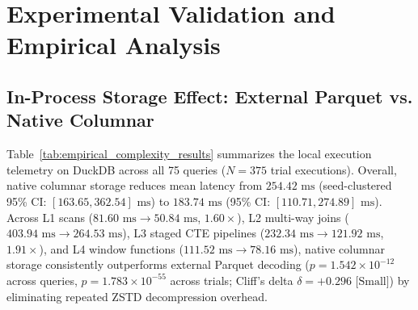 \documentclass[10pt,a4paper]{article}
\begin{document}
\section{Experimental Validation and Empirical Analysis}
\subsection{In-Process Storage Effect: External Parquet vs. Native Columnar}
Table~\ref{tab:empirical_complexity_results} summarizes the local execution telemetry on DuckDB across all 75 queries ($N=375$ trial executions). Overall, native columnar storage reduces mean latency from $254.42\text{ ms}$ (seed-clustered 95\% CI: $[163.65, 362.54]\text{ ms}$) to $183.74\text{ ms}$ (95\% CI: $[110.71, 274.89]\text{ ms}$). Across L1 scans ($81.60\text{ ms} \rightarrow 50.84\text{ ms}$, $1.60\times$), L2 multi-way joins ($403.94\text{ ms} \rightarrow 264.53\text{ ms}$), L3 staged CTE pipelines ($232.34\text{ ms} \rightarrow 121.92\text{ ms}$, $1.91\times$), and L4 window functions ($111.52\text{ ms} \rightarrow 78.16\text{ ms}$), native columnar storage consistently outperforms external Parquet decoding ($p = 1.542 \times 10^{-12}$ across queries, $p = 1.783 \times 10^{-55}$ across trials; Cliff's delta $\delta = +0.296\text{ [Small]}$) by eliminating repeated ZSTD decompression overhead.
\end{document}
